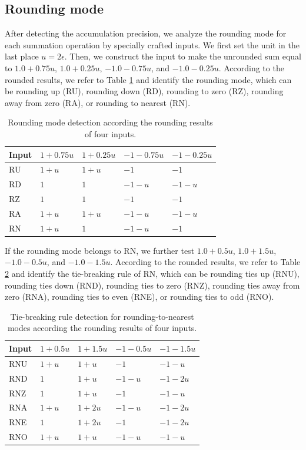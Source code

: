 \subsection{Rounding mode}

After detecting the accumulation precision, we analyze the rounding mode for each summation operation by specially crafted inputs. We first set the unit in the last place $u=2\epsilon$. Then, we construct the input to make the unrounded sum equal to $1.0+0.75u$, $1.0+0.25u$, $-1.0-0.75u$, and $-1.0-0.25u$. According to the rounded results, we refer to Table \ref{tab:rounding} and identify the rounding mode, which can be rounding up (RU), rounding down (RD), rounding to zero (RZ), rounding away from zero (RA), or rounding to nearest (RN).

\begin{table}[ht]
\caption{Rounding mode detection according the rounding results of four inputs.}
\label{tab:rounding}
\centering
\begin{tabular}{|l|l|l|l|l|}
\hline
Input & $1+0.75u$ & $1+0.25u$ & $-1-0.75u$ & $-1-0.25u$ \\ \hline
RU & $1+u$ & $1+u$ & $-1$ & $-1$ \\ \hline
RD & $1$ & $1$ & $-1-u$ & $-1-u$ \\ \hline
RZ & $1$ & $1$ & $-1$ & $-1$ \\ \hline
RA & $1+u$ & $1+u$ & $-1-u$ & $-1-u$ \\ \hline
RN & $1+u$ & $1$ & $-1-u$ & $-1$ \\ \hline
\end{tabular}
\end{table}

If the rounding mode belongs to RN, we further test $1.0+0.5u$, $1.0+1.5u$, $-1.0-0.5u$, and $-1.0-1.5u$. According to the rounded results, we refer to Table \ref{tab:rn} and identify the tie-breaking rule of RN, which can be rounding ties up (RNU), rounding ties down (RND), rounding ties to zero (RNZ), rounding ties away from zero (RNA), rounding ties to even (RNE), or rounding ties to odd (RNO).

\begin{table}[ht]
\caption{Tie-breaking rule detection for rounding-to-nearest modes according the rounding results of four inputs.}
\label{tab:rn}
\centering
\begin{tabular}{|l|l|l|l|l|}
\hline
Input & $1+0.5u$ & $1+1.5u$ & $-1-0.5u$ & $-1-1.5u$ \\ \hline
RNU & $1+u$ & $1+u$ & $-1$ & $-1-u$ \\ \hline
RND & $1$ & $1+u$ & $-1-u$ & $-1-2u$ \\ \hline
RNZ & $1$ & $1+u$ & $-1$ & $-1-u$ \\ \hline
RNA & $1+u$ & $1+2u$ & $-1-u$ & $-1-2u$ \\ \hline
RNE & $1$ & $1+2u$ & $-1$ & $-1-2u$ \\ \hline
RNO & $1+u$ & $1+u$ & $-1-u$ & $-1-u$ \\ \hline
\end{tabular}
\end{table}

